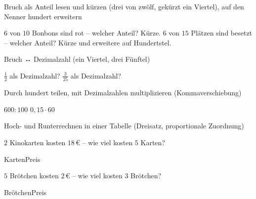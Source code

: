 \setcounter{aufgabe}{0}

\begin{aufgabe}{Bruch als Anteil lesen und kürzen (drei von zwölf, gekürzt ein Viertel), auf den Nenner hundert erweitern}
\begin{teile}
\teil $6$ von $10$ Bonbons sind rot – welcher Anteil? Kürze. \leerfeld
\teil $6$ von $15$ Plätzen sind besetzt – welcher Anteil? Kürze und erweitere auf Hundertstel. \leerfeld
\end{teile}
\end{aufgabe}

\begin{aufgabe}{Bruch ↔ Dezimalzahl (ein Viertel, drei Fünftel)}
\begin{teile}
\teil $\frac{1}{2}$ als Dezimalzahl? \leerfeld
\teil $\frac{3}{25}$ als Dezimalzahl? \leerfeld
\end{teile}
\end{aufgabe}

\begin{aufgabe}{Durch hundert teilen, mit Dezimalzahlen multiplizieren (Kommaverschiebung)}
\begin{teile}
\teil $600 : 100$ \leerfeld
\teil $0{,}15 \cdot 60$ \leerfeld
\end{teile}
\end{aufgabe}

\begin{aufgabe}{Hoch- und Runterrechnen in einer Tabelle (Dreisatz, proportionale Zuordnung)}
\begin{teile}
\teil $2$ Kinokarten kosten $18\,€$ – wie viel kosten $5$ Karten?

\begin{dreisatz}{Karten}{Preis}\dsp{\phantom{:0}}{\phantom{:0}}\dsp{\phantom{:0}}{\phantom{:0}}\end{dreisatz}
\teil $5$ Brötchen kosten $2\,€$ – wie viel kosten $3$ Brötchen?

\begin{dreisatz}{Brötchen}{Preis}\dsp{\phantom{:0}}{\phantom{:0}}\dsp{\phantom{:0}}{\phantom{:0}}\end{dreisatz}
\end{teile}
\end{aufgabe}

